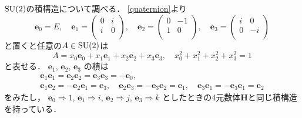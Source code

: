 $\operatorname{SU}(2)$の積構造について調べる．
\eqref{quaternion}より
\[
   \mathbf e_0=E,\quad
   \mathbf e_1=
   \begin{pmatrix}
     0 &i\\
      i& 0\\
   \end{pmatrix},\quad
  \mathbf e_2
   =
   \begin{pmatrix}
     0 &-1\\
      1& 0\\
   \end{pmatrix},\quad
  \mathbf e_3
   =
   \begin{pmatrix}
      i &0\\
      0& -i\\
   \end{pmatrix}
\]
と置くと任意の$A\in \operatorname{SU}(2)$は
\[
   A=
   x_0 \mathbf e_0+ x_1\mathbf e_1
   + x_2\mathbf e_2+ x_3\mathbf e_3,\quad
    x_0^2+x_1^2+x_2^2+x_3^2=1
\]と表せる．
$\mathbf e_1$, 
$\mathbf e_2$, 
$\mathbf e_3$ の積は
\begin{gather*}
	\mathbf e_1\mathbf e_1=\mathbf e_2\mathbf e_2=\mathbf e_3\mathbf e_3=-\mathbf e_0,\\
	\mathbf e_1\mathbf e_2=-\mathbf e_2\mathbf e_1=\mathbf e_3,\quad 
	\mathbf e_2\mathbf e_3=-\mathbf e_3\mathbf e_2=\mathbf e_1,\quad
	\mathbf e_3\mathbf e_1=-\mathbf e_3\mathbf e_1=\mathbf e_2
\end{gather*}
をみたし，
$\mathbf e_0\Rightarrow 1$, 
$\mathbf e_1\Rightarrow i$,
 $\mathbf e_2\Rightarrow j $, 
 $\mathbf e_3\Rightarrow k $
 としたときの$4$元数体$\mathbf H$と同じ積構造を持っている．


